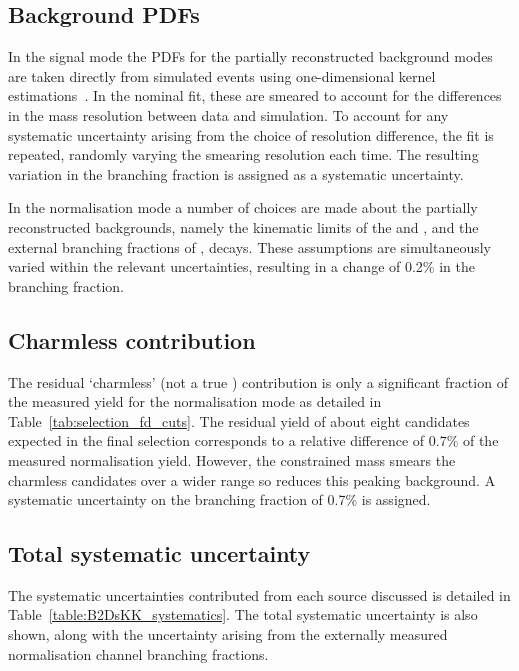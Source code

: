 \subsection{Background PDFs}

In the signal mode the PDFs for the partially reconstructed background modes are taken directly from simulated events using one-dimensional kernel estimations~\cite{Cranmer:2000du}. In the nominal fit, these are smeared to account for the differences in the mass resolution between data and simulation. To account for any systematic uncertainty arising from the choice of resolution difference, the fit is repeated, randomly varying the smearing resolution each time. The resulting variation in the branching fraction is assigned as a systematic uncertainty. 

In the normalisation mode a number of choices are made about the partially reconstructed backgrounds, namely the kinematic limits of the \decay{\Bp}{\Dssp\Dzb} and \decay{\Bp}{\Dsp\Dstarzb}, and the external branching fractions of \decay{\Dssp}{\Dsp[\Pgamma/\piz]},
 \decay{\Dstarzb}{\Dzb[\Pgamma/\piz]} decays. These assumptions are simultaneously varied within the relevant uncertainties, resulting in a change of 0.2\% in the branching fraction.



\subsection{Charmless contribution}

The residual `charmless' (not a true \Dsp) contribution is only a significant fraction of the measured yield for the normalisation mode as detailed in Table~\ref{tab:selection_fd_cuts}. The residual yield of about eight candidates expected in the final selection corresponds to a relative difference of 0.7\% of the measured normalisation yield. However, the constrained \Dsp mass smears the charmless candidates over a wider range so reduces this peaking background.
A systematic uncertainty on the branching fraction of 0.7\% is assigned.



\subsection{Total systematic uncertainty}
The systematic uncertainties contributed from each source discussed is detailed in Table~\ref{table:B2DsKK_systematics}. The total systematic uncertainty is also shown, along with the uncertainty arising from the externally measured normalisation channel branching fractions. 

